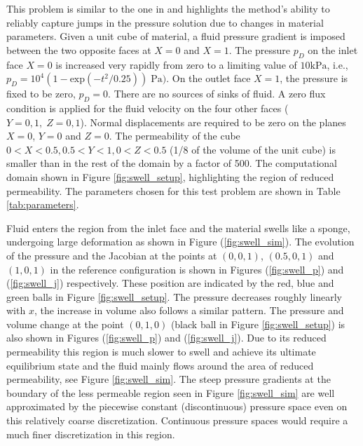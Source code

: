 This  problem is similar to the one in \cite{chapelle2010poroelastic} and highlights the method's ability to reliably capture jumps in the pressure solution due to changes in material parameters. Given a unit cube of material, a fluid pressure gradient is imposed between the two opposite faces at $X=0$ and $X=1$. The pressure $p_{D}$ on the inlet face $X = 0$ is increased very rapidly from zero to a limiting value of $10 \mbox{kPa}$, i.e., $p_{D} = 10^{4} (1-\mbox{exp}(-t^{2}/0.25)) \;\mbox{Pa})$. On the outlet face $X = 1$, the pressure is fixed to be zero, $p_{D} =0$. There are no sources of sinks of fluid. A zero flux condition is applied for the fluid velocity on the four other faces ($Y=0,1, \;Z=0,1$). Normal displacements are required to be zero on the planes $X = 0$, $Y = 0$ and $Z = 0$.  The permeability of the cube $0 < X < 0.5, 0.5 < Y < 1, 0 < Z <0.5$ (1/8 of the volume of the unit cube) is smaller than in the rest of the domain by a factor of 500. The computational domain shown in Figure \ref{fig:swell_setup}, highlighting the region of reduced permeability. The parameters chosen for this test problem are shown in Table \ref{tab:parameters}.

Fluid enters the region from the inlet face and the material swells like a sponge, undergoing large deformation as shown in Figure (\ref{fig:swell_sim}). The evolution of the pressure and the Jacobian at the points at $(0,0,1)$, $(0.5,0,1)$ and $(1,0,1)$ in the reference configuration is shown in Figures (\ref{fig:swell_p}) and (\ref{fig:swell_j}) respectively. These position are indicated by the red, blue and green balls in Figure \ref{fig:swell_setup}. The pressure decreases roughly linearly with $x$, the increase in volume also follows a similar pattern.  The pressure and volume change at the point $(0,1,0)$ (black ball in Figure \ref{fig:swell_setup}) is also shown in Figures (\ref{fig:swell_p}) and (\ref{fig:swell_j}). Due to its reduced permeability this region is much slower to swell and achieve its ultimate equilibrium state and the fluid mainly flows around the area of reduced permeability, see Figure \ref{fig:swell_sim}. The steep pressure gradients at the boundary of the less permeable region seen in Figure \ref{fig:swell_sim} are well approximated by the piecewise constant (discontinuous) pressure space even on this relatively coarse discretization. Continuous pressure spaces would require a much finer discretization in this region.

